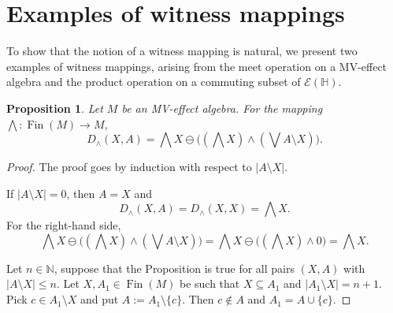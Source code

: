\documentclass[letterpaper]{amsart}
\newtheorem{proposition}{Proposition}
\theoremstyle{definition}
\DeclareMathOperator*\Fin{Fin}
\begin{document}
\section{Examples of witness mappings}
To show that the notion of a witness mapping is natural, we present
two examples of witness mappings, arising from the meet operation on a MV-effect algebra
and the product operation on a commuting subset of $\mathcal E(\mathbb H)$.
\begin{proposition}
\label{prop:Dwedge}
Let $M$ be an MV-effect algebra.
For the mapping
$\bigwedge:\Fin(M)\to M$,
$$
D_\wedge(X,A)=\bigwedge X\ominus\bigl((\bigwedge X)\wedge(\bigvee A\setminus X)\bigr).
$$
\end{proposition}
\begin{proof}
The proof goes by induction with respect to $|A\setminus X|$.

If $|A\setminus X|=0$, then $A=X$ and
$$
D_\wedge(X,A)=D_\wedge(X,X)=\bigwedge X.
$$
For the right-hand side,
$$
\bigwedge X\ominus\bigl((\bigwedge X)\wedge(\bigvee A\setminus X)\bigr)=
\bigwedge X\ominus\bigl((\bigwedge X)\wedge 0\bigr)=
\bigwedge X.
$$

Let $n\in\mathbb N$, suppose that the Proposition is true for all pairs $(X,A)$ with
$|A\setminus X|\leq n$. Let $X,A_1\in\Fin(M)$ be such that $X\subseteq A_1$ and
$|A_1\setminus X|=n+1$. Pick $c\in A_1\setminus X$ and put $A:=A_1\setminus\{c\}$.
Then $c\notin A$ and $A_1=A\cup\{c\}$. 


\end{proof}
\end{document}
